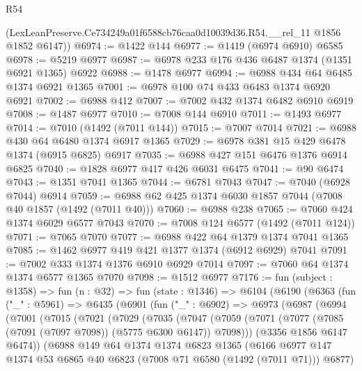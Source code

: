 \begin{lexlean}{R54}
\begin{coremodule}
      (LexLeanPreserve.Ce734249a01f6588cb76caa0d10039d36.R54.__rel_11 @1856 @1852 @6147))
@6974 := @1422 @144
@6977 := @1419 (@6974 @6910) @6585
@6978 := @5219 @6977
@6987 := @6978 @233 @176 @436 @6487 @1374 (@1351 @6921 @1365) @6922
@6988 := @1478 @6977
@6994 := @6988 @434 @64 @6485 @1374 @6921 @1365
@7001 := @6978 @100 @74 @433 @6483 @1374 @6920 @6921
@7002 := @6988 @412
@7007 := @7002 @432 @1374 @6482 @6910 @6919
@7008 := @1487 @6977
@7010 := @7008 @144 @6910
@7011 := @1493 @6977
@7014 := @7010 (@1492 (@7011 @144))
@7015 := @7007 @7014
@7021 := @6988 @430 @64 @6480 @1374 @6917 @1365
@7029 := @6978 @381 @15 @429 @6478 @1374 (@6915 @6825) @6917
@7035 := @6988 @427 @151 @6476 @1376 @6914 @6825
@7040 := @1828 @6977 @417 @426 @6031 @6475
@7041 := @90 @6474
@7043 := @1351 @7041 @1365
@7044 := @6781 @7043
@7047 := @7040 (@6928 @7044) @6914
@7059 := @6988 @62 @425 @1374 @6030 @1857 @7044 (@7008 @40 @1857 (@1492 (@7011 @40)))
@7060 := @6988 @238
@7065 := @7060 @424 @1374 @6029 @6577 @7043
@7070 := @7008 @124 @6577 (@1492 (@7011 @124))
@7071 := @7065 @7070
@7077 := @6988 @422 @64 @1379 @1374 @7041 @1365
@7085 := @1462 @6977 @419 @421 @1377 @1374 (@6912 @6929) @7041
@7091 := @7002 @333 @1374 @1376 @6910 @6929 @7014
@7097 := @7060 @64 @1374 @1374 @6577 @1365 @7070
@7098 := @1512 @6977
@7176 := fun (subject : @1358) =>
  fun (n : @32) =>
  fun (state : @1346) =>
  @6104
    (@6190
      (@6363
        (fun ("_" : @5961) =>
        @6435
          (@6901
            (fun ("_" : @6902) =>
            @6973
              (@6987
                (@6994
                  (@7001
                    (@7015
                      (@7021
                        (@7029
                          (@7035
                            (@7047
                              (@7059
                                (@7071
                                  (@7077 (@7085 (@7091 (@7097 @7098)) (@5775 @6300 @6147)) @7098)))
                              (@3356 @1856 @6147 @6474))
                            (@6988
                              @149
                              @64
                              @1374
                              @1374
                              @6823
                              @1365
                              (@6166
                                @6977
                                @147
                                @1374
                                @53
                                @6865
                                @40
                                @6823
                                (@7008 @71 @6580 (@1492 (@7011 @71)))
                                @6877)

\end{coremodule}
\end{lexlean}
